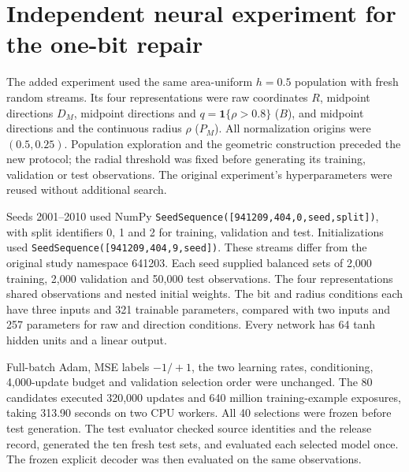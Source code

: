 \section{Independent neural experiment for the one-bit repair}
\label{supp:one-bit-experiment}

The added experiment used the same area-uniform $h=0.5$ population with fresh random streams. Its four representations were raw coordinates $R$, midpoint directions $D_M$, midpoint directions and $q=\mathbf1\{\rho>0.8\}$ ($B$), and midpoint directions and the continuous radius $\rho$ ($P_M$). All normalization origins were $(0.5,0.25)$. Population exploration and the geometric construction preceded the new protocol; the radial threshold was fixed before generating its training, validation or test observations. The original experiment's hyperparameters were reused without additional search.

Seeds 2001--2010 used NumPy \texttt{SeedSequence([941209,404,0,seed,split])}, with split identifiers 0, 1 and 2 for training, validation and test. Initializations used \texttt{SeedSequence([941209,404,9,seed])}. These streams differ from the original study namespace 641203. Each seed supplied balanced sets of 2,000 training, 2,000 validation and 50,000 test observations. The four representations shared observations and nested initial weights. The bit and radius conditions each have three inputs and 321 trainable parameters, compared with two inputs and 257 parameters for raw and direction conditions. Every network has 64 tanh hidden units and a linear output.

Full-batch Adam, MSE labels $-1/+1$, the two learning rates, conditioning, 4,000-update budget and validation selection order were unchanged. The 80 candidates executed 320,000 updates and 640 million training-example exposures, taking 313.90 seconds on two CPU workers. All 40 selections were frozen before test generation. The test evaluator checked source identities and the release record, generated the ten fresh test sets, and evaluated each selected model once. The frozen explicit decoder was then evaluated on the same observations.

